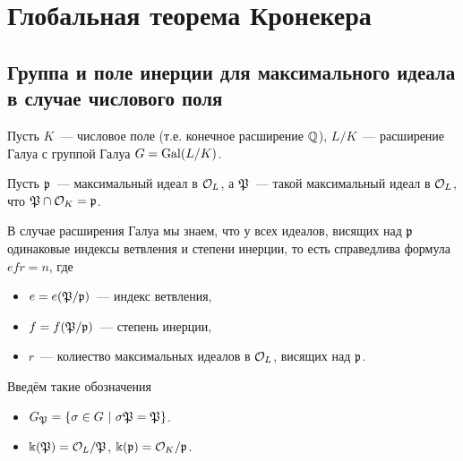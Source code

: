 	\section{Глобальная теорема Кронекера}

	\subsection{Группа и поле инерции для максимального идеала в случае числового поля}

	Пусть $K$~--- числовое поле (т.е. конечное расширение $\mathbb{Q}$), $L/K$~--- расширение Галуа с группой Галуа $G = \operatorname{Gal}(L/K)$.

	Пусть $\mathfrak{p}$~--- максимальный идеал в $\mathcal{O}_L$, а $\mathfrak{P}$~--- такой максимальный идеал в $\mathcal{O}_L$, что $\mathfrak{P} \cap \mathcal{O}_K = \mathfrak{p}$. 

	В случае расширения Галуа мы знаем, что у всех идеалов, висящих над $\mathfrak{p}$ одинаковые индексы ветвления и степени инерции, то есть справедлива формула $e f r = n$, где 
	\begin{itemize}
	 	\item $e = e(\mathfrak{P}/\mathfrak{p})$~--- индекс ветвления, 
	 	\item $f = f(\mathfrak{P}/\mathfrak{p})$~--- степень инерции, 
	 	\item $r$~--- колиество максимальных идеалов в $\mathcal{O}_L$, висящих над $\mathfrak{p}$.
	 \end{itemize} 

	 Введём такие обозначения 
	 \begin{itemize}
	 	\item $G_{\fP} = \{ \sigma \in G \ \vert \ \sigma \fP = \fP \}$. 
	 	\item $\Bbbk\lr*{\fP} = \cO_L/\fP$, $\Bbbk\lr*{\fp} = \cO_K/\fp$.
	 \end{itemize}

